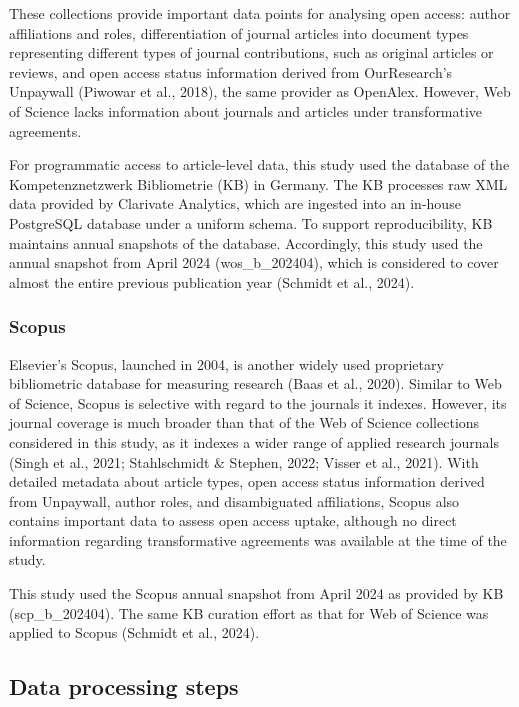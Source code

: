 \documentclass[a4paper,man,floatsintext,longtable,noextraspace,10pt]{apa6}
\begin{document}
These collections provide important data points for analysing open
access: author affiliations and roles, differentiation of journal
articles into document types representing different types of journal
contributions, such as original articles or reviews, and open access
status information derived from OurResearch's Unpaywall (Piwowar et al.,
2018), the same provider as OpenAlex. However, Web of Science lacks
information about journals and articles under transformative agreements.

For programmatic access to article-level data, this study used the
database of the Kompetenznetzwerk Bibliometrie (KB) in Germany. The KB
processes raw XML data provided by Clarivate Analytics, which are
ingested into an in-house PostgreSQL database under a uniform schema. To
support reproducibility, KB maintains annual snapshots of the database.
Accordingly, this study used the annual snapshot from April 2024
(wos\_b\_202404), which is considered to cover almost the entire
previous publication year (Schmidt et al., 2024).

\subsubsection{Scopus}\label{scopus}

Elsevier's Scopus, launched in 2004, is another widely used proprietary
bibliometric database for measuring research (Baas et al., 2020).
Similar to Web of Science, Scopus is selective with regard to the
journals it indexes. However, its journal coverage is much broader than
that of the Web of Science collections considered in this study, as it
indexes a wider range of applied research journals (Singh et al., 2021;
Stahlschmidt \& Stephen, 2022; Visser et al., 2021). With detailed
metadata about article types, open access status information derived
from Unpaywall, author roles, and disambiguated affiliations, Scopus
also contains important data to assess open access uptake, although no
direct information regarding transformative agreements was available at
the time of the study.

This study used the Scopus annual snapshot from April 2024 as provided
by KB (scp\_b\_202404). The same KB curation effort as that for Web of
Science was applied to Scopus (Schmidt et al., 2024).

\subsection{Data processing steps}\label{data-processing-steps}
\end{document}
